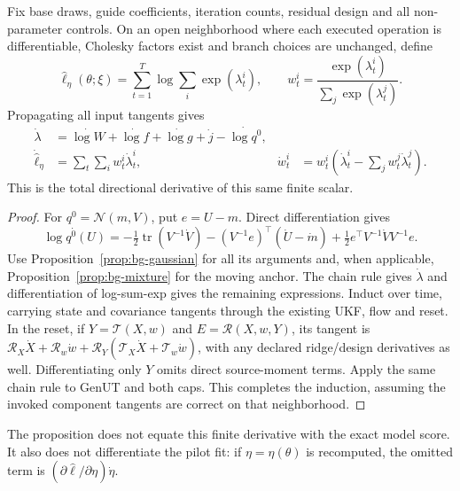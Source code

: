\begin{proposition}
\label{prop:bg-total}
Fix base draws, guide coefficients, iteration counts, residual design and
all non-parameter controls. On an open neighborhood where each executed
operation is differentiable, Cholesky factors exist and branch choices are
unchanged, define
\[
 \widehat\ell_\eta(\theta;\xi)
  =\sum_{t=1}^T \log\sum_i\exp(\lambda_t^i),\qquad
 w_t^i=\frac{\exp(\lambda_t^i)}{\sum_j\exp(\lambda_t^j)}.
\]
Propagating all input tangents gives
\begin{align}
 \dot\lambda&=\dot{\log W}+\dot{\log f}+\dot{\log g}
                         +\dot j-\dot{\log q^0},\nonumber\\
 \dot{\widehat\ell}_\eta&=\sum_t\sum_iw_t^i\dot\lambda_t^i,&
 \dot w_t^i&=w_t^i\left(\dot\lambda_t^i-\sum_jw_t^j\dot\lambda_t^j\right).
 \label{eq:bg-total}
\end{align}
This is the total directional derivative of this same finite scalar.
\end{proposition}
\begin{proof}
For $q^0=\mathcal N(m,V)$, put $e=U-m$. Direct differentiation gives
\[
 \dot{\log q^0(U)}=-\tfrac12\operatorname{tr}(V^{-1}\dot V)
 -(V^{-1}e)^\top(\dot U-\dot m)
 +\tfrac12e^\top V^{-1}\dot V V^{-1}e.
\]
Use Proposition~\ref{prop:bg-gaussian} for all its arguments and, when
applicable, Proposition~\ref{prop:bg-mixture} for the moving anchor. The
chain rule gives $\dot\lambda$ and differentiation of log-sum-exp gives
the remaining expressions. Induct over time, carrying state and covariance
tangents through the existing UKF, flow and reset. In the reset, if
$Y=\mathcal T(X,w)$ and $E=\mathcal R(X,w,Y)$, its tangent is
$\mathcal R_X\dot X+\mathcal R_w\dot w+
\mathcal R_Y(\mathcal T_X\dot X+\mathcal T_w\dot w)$, with any declared
ridge/design derivatives as well. Differentiating only $Y$ omits direct
source-moment terms. Apply the same chain rule to GenUT and both caps.
This completes the induction, assuming the invoked component tangents are
correct on that neighborhood.
\end{proof}
The proposition does not equate this finite derivative with the exact model
score. It also does not differentiate the pilot fit: if $\eta=\eta(\theta)$
is recomputed, the omitted term is
$(\partial\widehat\ell/\partial\eta)\dot\eta$.

